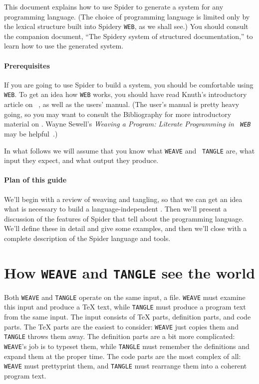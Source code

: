 This document explains how to use {Spider} to generate a {\WEB}
system for any programming language.
(The choice of programming language is limited only by the lexical
structure built into Spidery {\tt WEB}, as we shall see.)
You should consult the companion document, ``The Spidery {\WEB} system of
structured documentation,'' to learn how to use the generated {\WEB} system.

\paragraph{Prerequisites}
If you are going to use {Spider} to build a {\WEB} system,
you  should be comfortable using {\tt WEB}.
To get an idea how {\tt WEB} works, you should have read Knuth's
introductory article 
on {\WEB}~\cite{knuth:literate-programming}, as well as the {\WEB}
users' manual.
(The {\WEB} user's manual is pretty heavy going, so you may want to
consult the Bibliography for more introductory material on {\WEB}.
Wayne Sewell's {\it Weaving a Program: Literate Programming in {\tt
WEB}}
may be helpful~\cite{sewell:weaving}.)

In what follows we will assume that you know what {\tt WEAVE} and {\tt
TANGLE} are, what input they expect, and what output they produce.

\paragraph{Plan of this guide}
We'll begin with a review of weaving and tangling, so that we can get
an idea what is necessary to build a language-independent {\WEB}.
Then we'll present a discussion of the features of {Spider} that
tell {\WEB} about the programming language.
We'll define these in detail and give some examples, and then 
we'll close with a complete description of the {Spider} language
and tools.

\section{How {\tt WEAVE} and {\tt TANGLE} see the world}
Both {\tt WEAVE} and {\tt TANGLE} operate on the same input, a {\WEB}
file.
{\tt WEAVE} must examine this input and produce a {\TeX} text, while
{\tt TANGLE} must produce a program text from the same input.
The input consists of {\TeX} parts, definition parts, and code parts.
The {\TeX} parts are the easiest to consider: {\tt WEAVE} just copies
them and {\tt TANGLE} throws them away.
The definition parts are a bit more complicated: {\tt WEAVE}'s job is
to typeset them, while {\tt TANGLE} must remember the definitions and
expand them at the proper time.
The code parts are the most complex of all: {\tt WEAVE} must
prettyprint them, and {\tt TANGLE} must rearrange them into a coherent
program text.

